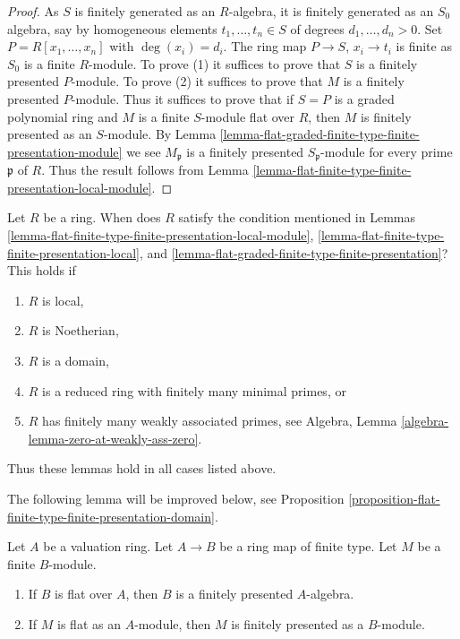 \begin{proof}
As $S$ is finitely generated as an $R$-algebra, it is finitely generated
as an $S_0$ algebra, say by homogeneous elements $t_1, \ldots, t_n \in S$
of degrees $d_1, \ldots, d_n > 0$. Set $P = R[x_1, \ldots, x_n]$ with
$\deg(x_i) = d_i$. The ring map $P \to S$, $x_i \to t_i$ is finite
as $S_0$ is a finite $R$-module. To prove (1) it suffices to prove
that $S$ is a finitely presented $P$-module.  To prove (2) it suffices
to prove that $M$ is a finitely presented $P$-module. Thus it suffices
to prove that if $S = P$ is a graded polynomial ring and $M$ is a finite
$S$-module flat over $R$, then $M$ is finitely presented as an $S$-module. By
Lemma \ref{lemma-flat-graded-finite-type-finite-presentation-module}
we see $M_{\mathfrak p}$ is a finitely presented $S_{\mathfrak p}$-module
for every prime $\mathfrak p$ of $R$. Thus the result follows from
Lemma \ref{lemma-flat-finite-type-finite-presentation-local-module}.
\end{proof}

\begin{remark}
\label{remark-when-does-condition-hold}
Let $R$ be a ring. When does $R$ satisfy the condition mentioned in
Lemmas \ref{lemma-flat-finite-type-finite-presentation-local-module},
\ref{lemma-flat-finite-type-finite-presentation-local}, and
\ref{lemma-flat-graded-finite-type-finite-presentation}?
This holds if
\begin{enumerate}
\item $R$ is local,
\item $R$ is Noetherian,
\item $R$ is a domain,
\item $R$ is a reduced ring with finitely many minimal primes, or
\item $R$ has finitely many weakly associated primes, see
Algebra, Lemma \ref{algebra-lemma-zero-at-weakly-ass-zero}.
\end{enumerate}
Thus these lemmas hold in all cases listed above.
\end{remark}

\noindent
The following lemma will be improved below, see
Proposition \ref{proposition-flat-finite-type-finite-presentation-domain}.

\begin{lemma}
\label{lemma-flat-finite-type-valuation-ring-finite-presentation}
Let $A$ be a valuation ring. Let $A \to B$ be a ring map of finite type.
Let $M$ be a finite $B$-module.
\begin{enumerate}
\item If $B$ is flat over $A$, then $B$ is a finitely presented $A$-algebra.
\item If $M$ is flat as an $A$-module, then $M$ is finitely presented
as a $B$-module.
\end{enumerate}
\end{lemma}

